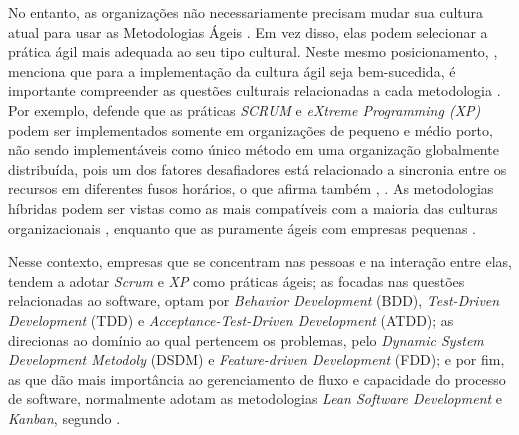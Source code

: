 No entanto, as organizações não necessariamente precisam mudar sua cultura atual para usar as Metodologias Ágeis \citeauthor{Bunyakiati2016} \citeyear{Bunyakiati2016}. Em vez disso, elas podem selecionar a prática ágil mais adequada ao seu tipo cultural. Neste mesmo posicionamento, \citeauthor{Lazwanthi2016} \citeyear{Lazwanthi2016}, menciona que para a implementação da cultura ágil seja bem-sucedida, é importante compreender as questões culturais relacionadas a cada metodologia \citeauthor{Lazwanthi2016} \citeyear{Lazwanthi2016}. Por exemplo, \citeauthor{Lazwanthi2016} \citeyear{Lazwanthi2016} defende que as práticas \textit{SCRUM} e \textit{eXtreme Programming (XP)} podem ser implementados somente em organizações de pequeno e médio porto, não sendo implementáveis como único método em uma organização globalmente distribuída, pois um dos fatores desafiadores está relacionado a sincronia entre os recursos em diferentes fusos horários, o que afirma também \citeauthor{Asnawi2012} \citeyear{Asnawi2011}, \citeyear{Asnawi2012}. As metodologias híbridas podem ser vistas como as mais compatíveis com a maioria das culturas organizacionais \citeauthor{Lazwanthi2016} \citeyear{Lazwanthi2016}, enquanto que as puramente ágeis com empresas pequenas \citeauthor{Asnawi2011} \citeyear{Asnawi2011}.

Nesse contexto, empresas que se concentram nas pessoas e na interação entre elas, tendem a adotar \textit{Scrum} e \textit{XP} como práticas ágeis; as focadas nas questões relacionadas ao software, optam por \textit{Behavior Development} (BDD), \textit{Test-Driven Development} (TDD) e \textit{Acceptance-Test-Driven Development} (ATDD); as direcionas ao domínio ao qual pertencem os problemas, pelo \textit{Dynamic System Development Metodoly} (DSDM) e \textit{Feature-driven Development} (FDD); e por fim, as que dão mais importância ao gerenciamento de fluxo e capacidade do processo de software, normalmente adotam as metodologias \textit{Lean Software Development} e \textit{Kanban}, segundo \citeauthor{Lazwanthi2016} \citeyear{Lazwanthi2016}. 

